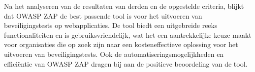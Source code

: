 Na het analyseren van de resultaten van derden en de opgestelde criteria, blijkt dat OWASP ZAP de best passende tool is voor het uitvoeren van 
beveiligingstests op webapplicaties. De tool biedt een uitgebreide reeks functionaliteiten en is gebruiksvriendelijk, wat 
het een aantrekkelijke keuze maakt voor organisaties die op zoek zijn naar een kosteneffectieve oplossing voor het uitvoeren 
van beveiligingstests. Ook de automatiseringsmogelijkheden en efficiëntie van OWASP ZAP dragen bij aan de positieve 
beoordeling van de tool.

\section{}
\subsection{}
\subsection{}


